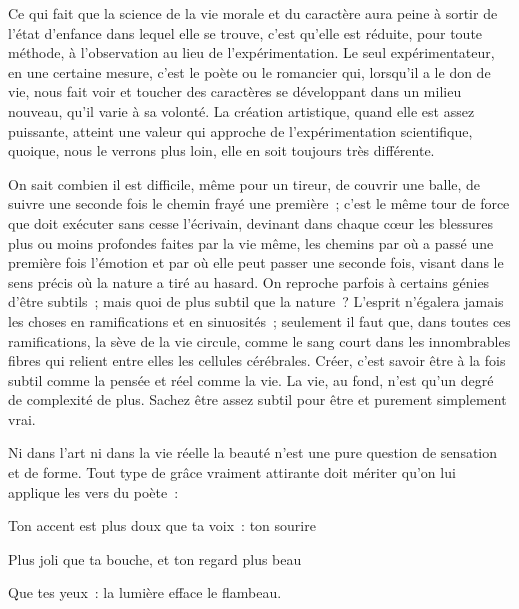 \documentclass[french,twoside]{book} %
\newenvironment{quoteblock}%
  {\begin{quoting}}
  {\end{quoting}}
\newenvironment{quotebar}{%
    \def\FrameCommand{{\color{rubric!10!}\vrule width 0.5em} \hspace{0.9em}}%
    \def\OuterFrameSep{\itemsep} %
    \MakeFramed {\advance\hsize-\width \FrameRestore}
  }%
  {%
    \endMakeFramed
  }
\renewenvironment{quoteblock}%
  {%
    \savenotes
    \setstretch{0.9}
    \normalfont
    \begin{quotebar}
  }
  {%
    \end{quotebar}
    \spewnotes
  }
\begin{document}
Ce qui fait que la science de la vie morale et du caractère aura peine à sortir de l’état d’enfance dans lequel elle se trouve, c’est qu’elle est réduite, pour toute méthode, à l’observation au lieu de l’expérimentation. Le seul expérimentateur, en une certaine mesure, c’est le poète ou le romancier qui, lorsqu’il a le don de vie, nous fait voir et toucher des caractères se développant dans un milieu nouveau, qu’il varie à sa volonté. La création artistique, quand elle est assez puissante, atteint une valeur qui approche de l’expérimentation scientifique, quoique, nous le verrons plus loin, elle en soit toujours très différente.\par
On sait combien il est difficile, même pour un tireur, de couvrir une balle, de suivre une seconde fois le chemin frayé une première ; c’est le même tour de force que doit exécuter sans cesse l’écrivain, devinant dans chaque cœur les blessures plus ou moins profondes faites par la vie même, les chemins par où a passé une première fois l’émotion et par où elle peut passer une seconde fois, visant dans le sens précis où la nature a tiré au hasard. On reproche parfois à certains génies d’être subtils ; mais quoi de plus subtil que la nature ? L’esprit n’égalera jamais les choses en ramifications et en sinuosités ; seulement il faut que, dans toutes ces ramifications, la sève de la vie circule, comme le sang court dans les innombrables fibres qui relient entre elles les cellules cérébrales. Créer, c’est savoir être à la fois subtil comme la pensée et réel comme la vie. La vie, au fond, n’est qu’un degré de complexité de plus. Sachez être assez subtil pour être et purement simplement vrai.\par
Ni dans l’art ni dans la vie réelle la beauté n’est une pure question de sensation et de forme. Tout type de grâce vraiment attirante doit mériter qu’on lui applique les vers du poète :\par

\begin{quoteblock}
 \noindent Ton accent est plus doux que ta voix : ton sourire\par
 Plus joli que ta bouche, et ton regard plus beau\par
 Que tes yeux : la lumière efface le flambeau.
 \end{quoteblock}
\end{document}

